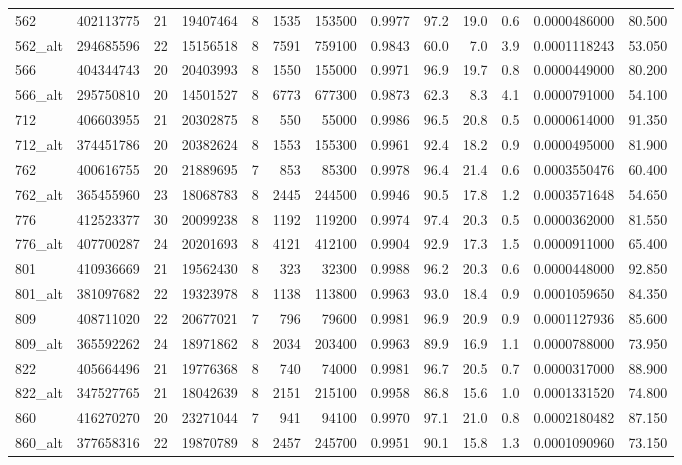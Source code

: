 \begin{table}[!t]
\begin{tabular*}{\linewidth}{@{\extracolsep{\fill}}lrrrrrrrrrrrr}
562 & 402113775 & 21 & 19407464 & 8 & 1535 & 153500 & 0.9977 & 97.2 & 19.0 & 0.6 & 0.0000486000 & 80.500 \\ 
562\_alt & 294685596 & 22 & 15156518 & 8 & 7591 & 759100 & 0.9843 & 60.0 & 7.0 & 3.9 & 0.0001118243 & 53.050 \\ 
566 & 404344743 & 20 & 20403993 & 8 & 1550 & 155000 & 0.9971 & 96.9 & 19.7 & 0.8 & 0.0000449000 & 80.200 \\ 
566\_alt & 295750810 & 20 & 14501527 & 8 & 6773 & 677300 & 0.9873 & 62.3 & 8.3 & 4.1 & 0.0000791000 & 54.100 \\ 
712 & 406603955 & 21 & 20302875 & 8 & 550 & 55000 & 0.9986 & 96.5 & 20.8 & 0.5 & 0.0000614000 & 91.350 \\ 
712\_alt & 374451786 & 20 & 20382624 & 8 & 1553 & 155300 & 0.9961 & 92.4 & 18.2 & 0.9 & 0.0000495000 & 81.900 \\ 
762 & 400616755 & 20 & 21889695 & 7 & 853 & 85300 & 0.9978 & 96.4 & 21.4 & 0.6 & 0.0003550476 & 60.400 \\ 
762\_alt & 365455960 & 23 & 18068783 & 8 & 2445 & 244500 & 0.9946 & 90.5 & 17.8 & 1.2 & 0.0003571648 & 54.650 \\ 
776 & 412523377 & 30 & 20099238 & 8 & 1192 & 119200 & 0.9974 & 97.4 & 20.3 & 0.5 & 0.0000362000 & 81.550 \\ 
776\_alt & 407700287 & 24 & 20201693 & 8 & 4121 & 412100 & 0.9904 & 92.9 & 17.3 & 1.5 & 0.0000911000 & 65.400 \\ 
801 & 410936669 & 21 & 19562430 & 8 & 323 & 32300 & 0.9988 & 96.2 & 20.3 & 0.6 & 0.0000448000 & 92.850 \\ 
801\_alt & 381097682 & 22 & 19323978 & 8 & 1138 & 113800 & 0.9963 & 93.0 & 18.4 & 0.9 & 0.0001059650 & 84.350 \\ 
809 & 408711020 & 22 & 20677021 & 7 & 796 & 79600 & 0.9981 & 96.9 & 20.9 & 0.9 & 0.0001127936 & 85.600 \\ 
809\_alt & 365592262 & 24 & 18971862 & 8 & 2034 & 203400 & 0.9963 & 89.9 & 16.9 & 1.1 & 0.0000788000 & 73.950 \\ 
822 & 405664496 & 21 & 19776368 & 8 & 740 & 74000 & 0.9981 & 96.7 & 20.5 & 0.7 & 0.0000317000 & 88.900 \\ 
822\_alt & 347527765 & 21 & 18042639 & 8 & 2151 & 215100 & 0.9958 & 86.8 & 15.6 & 1.0 & 0.0001331520 & 74.800 \\ 
860 & 416270270 & 20 & 23271044 & 7 & 941 & 94100 & 0.9970 & 97.1 & 21.0 & 0.8 & 0.0002180482 & 87.150 \\ 
860\_alt & 377658316 & 22 & 19870789 & 8 & 2457 & 245700 & 0.9951 & 90.1 & 15.8 & 1.3 & 0.0001090960 & 73.150 \\ 

\end{tabular*}
\end{table}
